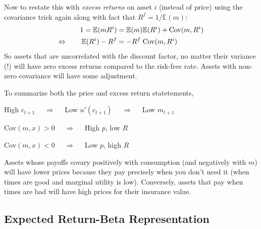 \documentclass[a4paper,12pt]{scrartcl}
\begin{document}
Now to restate this with \emph{excess returns} on asset $i$ (instead of
price) using the covariance trick again along with fact that
$R^f=1/\mathbb{E}(m)$:
\begin{align}
  1 = \mathbb{E}(mR^i)
  &= \mathbb{E}(m) \mathbb{E}(R^i) + \text{Cov}(m,R^i)\notag\\
  \Leftrightarrow \qquad
  \mathbb{E}(R^i) - R^f
  &= - R^f \; \text{Cov}(m,R^i)\label{eq:riskcorrect}
\end{align}
So assets that are uncorrelated with the discount factor, no matter
their variance (!) will have zero excess returns compared to the
risk-free rate. Assets with non-zero covariance will have some
adjustment.

To summarize both the price and excess return statetements,
\begin{center}
\begin{centering}
  High $c_{t+1}$ $\quad\Rightarrow\quad$
  Low $u'(c_{t+1})$ $\quad\Rightarrow\quad$
  Low $m_{t+1}$
\end{centering}
\end{center}
\begin{center}
\begin{centering}
  Cov$(m,x)>0$  $\quad\Rightarrow\quad$
  High $p$, low $R$
\end{centering}
\end{center}
\begin{center}
\begin{centering}
  Cov$(m,x)<0$  $\quad\Rightarrow\quad$
  Low $p$, high $R$
\end{centering}
\end{center}
Assets whose payoffs covary positively with consumption (and negatively
with $m$) will have lower prices because they pay precisely when you
don't need it (when times are good and marginal utility is low).
Conversely, assets that pay when times are bad will have high prices for
their insurance value.

\subsection{Expected Return-Beta Representation}
\end{document}
